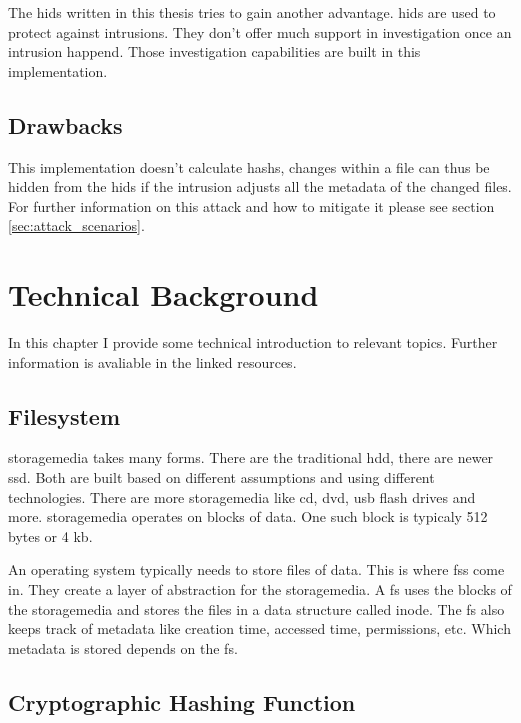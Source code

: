 \documentclass[
	a4paper,					%
	10pt,							%
	twoside,					%
	openright,				%
	notitlepage,			%
	parskip=half,			%
]{scrreprt}					%
\begin{document}
The \gls{hids} written in this thesis tries to gain another advantage. \gls{hids} are used to protect against \glspl{intrusion}. They don't offer much support in \gls{investigation} once an \gls{intrusion} happend. Those \gls{investigation} capabilities are built in this implementation. 

\section{Drawbacks}

This implementation doesn't calculate \glspl{hash}, changes within a file can thus be hidden from the \gls{hids} if the intrusion adjusts all the \gls{metadata} of the changed files. For further information on this attack and how to mitigate it please see section \ref{sec:attack_scenarios}.

\chapter{Technical Background}

In this chapter I provide some technical introduction to relevant topics. Further information is avaliable in the linked resources.

\section{Filesystem}
\label{sec:fs}

\gls{storagemedia} takes many forms. There are the traditional \gls{hdd}, there are newer \gls{ssd}. Both are built based on different assumptions and using different technologies. There are more \gls{storagemedia} like \gls{cd}, \gls{dvd}, \gls{usb} flash drives and more. \gls{storagemedia} operates on blocks of data. One such block is typicaly 512 bytes or 4 \gls{kb}. \cite{bruce:imaging}

An operating system typically needs to store files of data. This is where \glspl{fs} come in. They create a layer of abstraction for the \gls{storagemedia}. A \gls{fs} uses the blocks of the \gls{storagemedia} and stores the files in a data structure called inode. \cite{inode} The \gls{fs} also keeps track of \gls{metadata} like creation time, accessed time, permissions, etc. Which \gls{metadata} is stored depends on the \gls{fs}. \cite{bruce:imaging}

\section{Cryptographic Hashing Function}
\label{sec:hashing}
\end{document}
